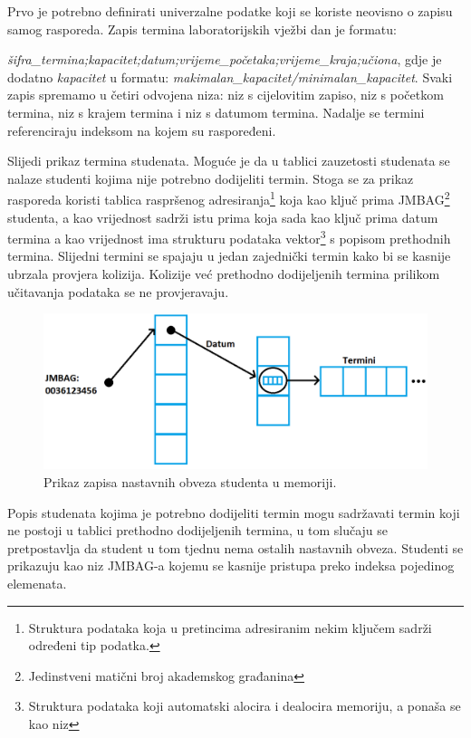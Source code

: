 \documentclass[times, utf8, zavrsni]{fer}
\begin{document}
Prvo je potrebno definirati univerzalne podatke koji se koriste neovisno o zapisu samog rasporeda. Zapis termina laboratorijskih vježbi dan je formatu:

\emph{šifra\_termina;kapacitet;datum;vrijeme\_početaka;vrijeme\_kraja;učiona}, gdje je dodatno \emph{kapacitet} u formatu: \emph{makimalan\_kapacitet/minimalan\_kapacitet}. Svaki zapis spremamo u četiri odvojena niza: niz s cijelovitim zapiso, niz s početkom termina, niz s krajem termina i niz s datumom termina. Nadalje se termini referenciraju indeksom na kojem su raspoređeni.

Slijedi prikaz termina studenata. Moguće je da u tablici zauzetosti studenata se nalaze studenti kojima nije potrebno dodijeliti termin. Stoga se za prikaz rasporeda koristi tablica raspršenog adresiranja\footnote{Struktura podataka koja u pretincima adresiranim nekim ključem sadrži određeni tip podatka.} koja kao ključ prima JMBAG\footnote{Jedinstveni matični broj akademskog građanina} studenta, a kao vrijednost sadrži istu prima koja sada kao ključ prima datum termina a kao vrijednost ima strukturu podataka vektor\footnote{Struktura podataka koji automatski alocira i dealocira memoriju, a ponaša se kao niz} s popisom prethodnih termina. Slijedni termini se spajaju u jedan zajednički termin kako bi se kasnije ubrzala provjera kolizija. Kolizije već prethodno dodijeljenih termina prilikom učitavanja podataka se ne provjeravaju.

\begin{figure}[htb]
\centering
\includegraphics[width=15cm]{images/prikaz_termina.png}
\caption{Prikaz zapisa nastavnih obveza studenta u memoriji.}
\label{fig:prikaz_termina}
\end{figure}

Popis studenata kojima je potrebno dodijeliti termin mogu sadržavati termin koji ne postoji u tablici prethodno dodijeljenih termina, u tom slučaju se pretpostavlja da student u tom tjednu nema ostalih nastavnih obveza. Studenti se prikazuju kao niz JMBAG-a kojemu se kasnije pristupa preko indeksa pojedinog elemenata.
\end{document}
